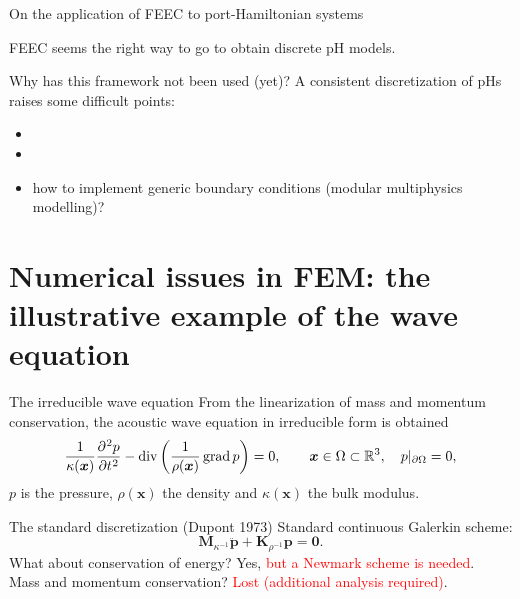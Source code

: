 \documentclass[aspectratio=169]{beamer}
\DeclareMathOperator*{\grad}{grad}
\renewcommand{\div}{\operatorname{div}}
\newcommand{\bbR}{\mathbb{R}}
\begin{document}
\begin{frame}{On the application of FEEC to port-Hamiltonian systems}

FEEC seems the right way to go to obtain discrete pH models. \\

\begin{alertblock}{Why has this framework not been used (yet)?}
A consistent discretization of pHs raises some difficult points:
\begin{itemize}
	\item {} \only<5->{\textcolor{blue}{how to exactly enforce discrete conservation laws?}}
	\item {}
	\item<4-> how to implement generic boundary conditions (modular multiphysics modelling)?
\end{itemize}
\end{alertblock}

\end{frame}

\section{Numerical issues in FEM: the illustrative example of the wave equation}


\begin{frame}{The irreducible wave equation}
From the linearization of mass and momentum conservation, the acoustic wave equation in irreducible form is obtained
\begin{equation*}
\frac{1}{\kappa(\bm{x})} \diffp[2]{p}{t} - \div\left(\frac{1}{\rho(\bm{x})}\grad p\right) = 0,  \qquad \bm{x} \in \Omega \subset \bbR^3, \quad p|_{\partial\Omega} =0,
\end{equation*}
$p$ is the pressure, $\rho(\bm{x})$ the density and $\kappa(\bm{x})$ the bulk modulus.


\begin{block}{The standard discretization (Dupont 1973)}
	Standard continuous Galerkin scheme:
	\begin{equation*}
		\mathbf{M}_{\kappa^{-1}} \ddot{\mathbf{p}} + \mathbf{K}_{\rho^{-1}} \mathbf{p} = \mathbf{0}.
	\end{equation*}
	What about conservation of energy? Yes, \textcolor{red}{but a Newmark scheme is needed}.\\
	Mass and momentum conservation? \textcolor{red}{Lost (additional analysis required)}.
\end{block}

\end{frame}
\end{document}
